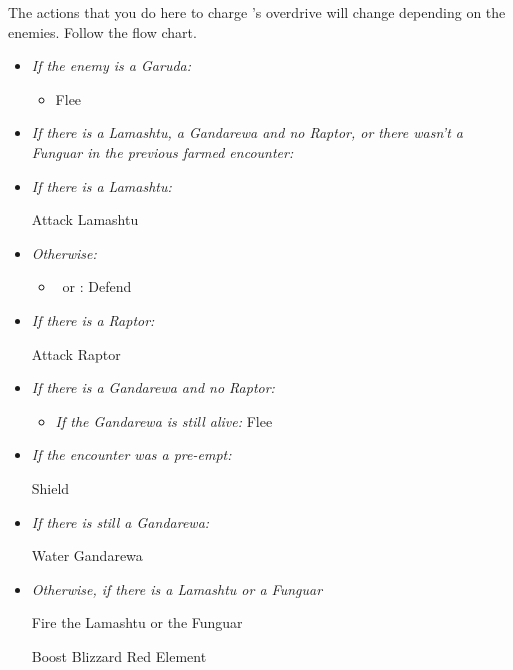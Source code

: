 \begin{encounters}
	The actions that you do here to charge \valefor's overdrive will change depending on the enemies. Follow the flow chart.
	\begin{itemize}
		\item \textit{If the enemy is a Garuda:}
		      \begin{itemize}
			      \item Flee
		      \end{itemize}
		\item \textit{If there is a Lamashtu, a Gandarewa and no Raptor, or there wasn't a Funguar in the previous farmed encounter:}
		      \begin{itemize}
			      \switch{\tidus}{\kimahri}
		      \end{itemize}
		\item \textit{If there is a Lamashtu:}
		      \begin{itemize}
			      \kimahrif Attack Lamashtu
		      \end{itemize}
		\item \textit{Otherwise:}
		      \begin{itemize}
			      \item \kimahri\ or \tidus: Defend
		      \end{itemize}
		\item \textit{If there is a Raptor:}
		      \begin{itemize}
			      \wakkaf Attack Raptor
		      \end{itemize}
		\item \textit{If there is a Gandarewa and no Raptor:}
		      \begin{itemize}
			      \kimahrif Lancet Gandarewa \textit{If you didn't attack a Lamashtu}
			      \wakkaf Attack Gandarewa
			      \item \textit{If the Gandarewa is still alive:} Flee
		      \end{itemize}
		      \switch{\auron}{\yuna}
		      \summon{\valefor}
		\item \textit{If the encounter was a pre-empt:}
		      \begin{itemize}
			      \valeforf Shield
		      \end{itemize}
		\item \textit{If there is still a Gandarewa:}
		      \begin{itemize}
			      \valeforf Water Gandarewa
		      \end{itemize}
		\item \textit{Otherwise, if there is a Lamashtu or a Funguar}
		      \begin{itemize}
			      \valeforf Fire the Lamashtu or the Funguar
		      \end{itemize}
		      \valeforf Boost
		      \valeforf Blizzard Red Element
	\end{itemize}
\end{encounters}
